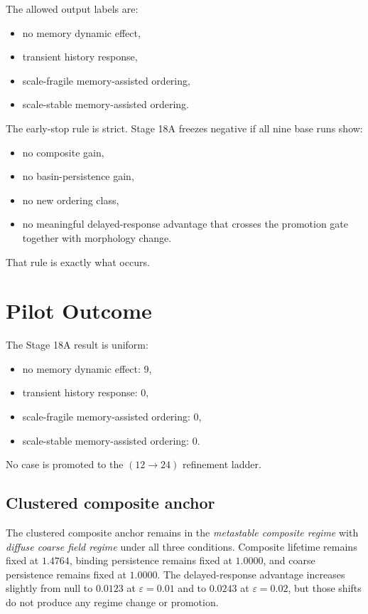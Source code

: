 \documentclass[11pt]{article}
\begin{document}
The allowed output labels are:
\begin{itemize}
\item no memory dynamic effect,
\item transient history response,
\item scale-fragile memory-assisted ordering,
\item scale-stable memory-assisted ordering.
\end{itemize}

The early-stop rule is strict. Stage 18A freezes negative if all nine base runs show:
\begin{itemize}
\item no composite gain,
\item no basin-persistence gain,
\item no new ordering class,
\item no meaningful delayed-response advantage that crosses the promotion gate together with morphology change.
\end{itemize}

That rule is exactly what occurs.

\section{Pilot Outcome}

The Stage 18A result is uniform:
\begin{itemize}
\item no memory dynamic effect: 9,
\item transient history response: 0,
\item scale-fragile memory-assisted ordering: 0,
\item scale-stable memory-assisted ordering: 0.
\end{itemize}

No case is promoted to the $(12 \rightarrow 24)$ refinement ladder.

\subsection{Clustered composite anchor}

The clustered composite anchor remains in the \emph{metastable composite regime} with \emph{diffuse coarse field regime} under all three conditions. Composite lifetime remains fixed at $1.4764$, binding persistence remains fixed at $1.0000$, and coarse persistence remains fixed at $1.0000$. The delayed-response advantage increases slightly from null to $0.0123$ at $\varepsilon=0.01$ and to $0.0243$ at $\varepsilon=0.02$, but those shifts do not produce any regime change or promotion.
\end{document}
